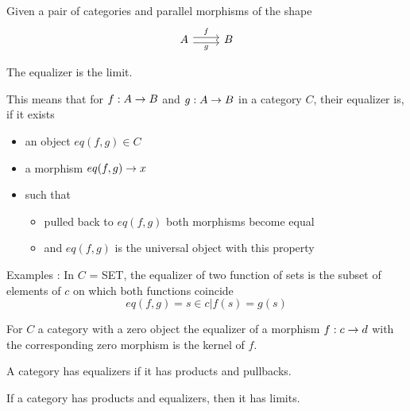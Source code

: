 \documentclass[../../notes.tex]{subfiles}
\begin{document}
\begin{definition}

  Given a pair of categories and parallel morphisms of the shape
  \[
  \begin{tikzcd}
    A \arrow[r, shift left, "f"] \arrow[r, shift right, swap, "g"]& B 
  \end{tikzcd}
\]

The equalizer is the limit. 
  
\end{definition}

This means that for $f : A \rightarrow B$ and $g : A \rightarrow B$ in a category $C$,
their equalizer is, if it exists
\begin{itemize}
\item an object $eq(f,g) \in C$
\item a morphism $eq(f,g) \rightarrow x$
\item such that
  \begin{itemize}
  \item pulled back to $eq(f,g)$ both morphisms become equal
  \item and $eq(f,g)$ is the universal object with this property
  \end{itemize}
\end{itemize}

Examples :
In $C$ = SET, the equalizer of two function of sets is the subset of
elements of $c$ on which both functions coincide
\[ eq(f,g) = {s \in c | f(s) = g(s)} \] 

For $C$ a category with a zero object the equalizer of a morphism
$f : c \rightarrow d$ with the corresponding zero morphism is the kernel of $f$.

\begin{prop}

  A category has equalizers if it has products and pullbacks.
  
\end{prop}

\begin{prop}

  If a category has products and equalizers, then it has limits.
  
\end{prop}
\end{document}
